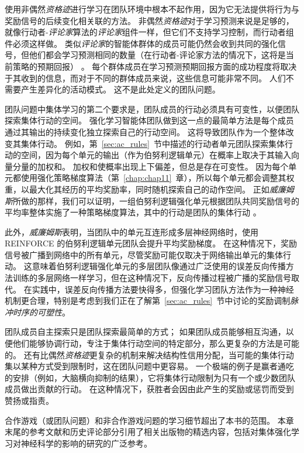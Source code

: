使用非偶然\textit{资格迹}进行学习在团队环境中根本不起作用，因为它无法提供将行为与奖励信号的后续变化相关联的方法。
非偶然\textit{资格迹}对于学习预测来说是足够的，就像行动者-\textit{评论家}算法的\textit{评论家}组件一样，但它们不支持学习控制，而行动者组件必须这样做。
类似\textit{评论家}的智能体群体的成员可能仍然会收到共同的强化信号，但他们都会学习预测相同的数量（在行动者-评论家方法的情况下，这将是当前策略的预期回报） 。
每个群体成员在学习预测预期回报方面的成功程度将取决于其收到的信息，而对于不同的群体成员来说，这些信息可能非常不同。
人们不需要产生差异化的活动模式。
这不是此处定义的团队问题。


团队问题中集体学习的第二个要求是，团队成员的行动必须具有可变性，以便团队探索集体行动的空间。
强化学习智能体团队做到这一点的最简单方法是每个成员通过其输出的持续变化独立探索自己的行动空间。
这将导致团队作为一个整体改变其集体行动。
例如，第~\ref{sec:ac_rules}~节中描述的行动者单元团队探索集体行动的空间，因为每个单元的输出（作为伯努利逻辑单元）在概率上取决于其输入向量分量的加权和。
加权和使概率出现上下偏差，但总是存在可变性。
因为每个单元都使用强化策略梯度算法（第~\ref{chap:chap11}~章），所以每个单元都会调整其权重，以最大化其经历的平均奖励率，同时随机探索自己的动作空间。
正如\textit{威廉姆斯}\cite{williams1992simple}所做的那样，我们可以证明，一组伯努利逻辑强化单元根据团队共同奖励信号的平均率整体实施了一种策略梯度算法，其中的行动是团队的集体行动 。


此外，\textit{威廉姆斯}\cite{williams1992simple}表明，当团队中的单元互连形成多层神经网络时，使用 REINFORCE 的伯努利逻辑单元团队会提升平均奖励梯度。
在这种情况下，奖励信号被广播到网络中的所有单元，尽管奖励可能仅取决于网络输出单元的集体行动。
这意味着伯努利逻辑强化单元的多层团队像通过广泛使用的误差反向传播方法训练的多层网络一样学习，但在这种情况下，反向传播过程被广播的奖励信号取代。
在实践中，误差反向传播方法要快得多，但强化学习团队方法作为一种神经机制更合理，特别是考虑到我们正在了解第~\ref{sec:ac_rules}~节中讨论的奖励调制\textit{脉冲时序的可塑性}。


团队成员自主探索只是团队探索最简单的方式；
如果团队成员能够相互沟通，以便他们能够协调行动，专注于集体行动空间的特定部分，那么更复杂的方法是可能的。
还有比偶然\textit{资格迹}更复杂的机制来解决结构性信用分配，当可能的集体行动集以某种方式受到限制时，这在团队问题中更容易。
一个极端的例子是赢者通吃的安排（例如，大脑横向抑制的结果），它将集体行动限制为只有一个或少数团队成员做出贡献的行动。
在这种情况下，获胜者会因由此产生的奖励或惩罚而受到赞扬或指责。


合作游戏（或团队问题）和非合作游戏问题的学习细节超出了本书的范围。
本章末尾的参考文献和历史评论部分引用了相关出版物的精选内容，包括对集体强化学习对神经科学的影响的研究的广泛参考。


